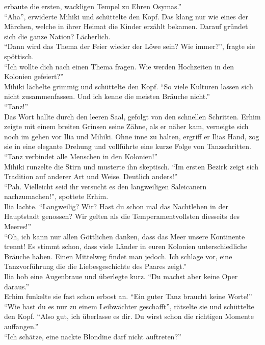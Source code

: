 erbaute die ersten, wackligen Tempel zu Ehren Osymas.''\\
``Aha'', erwiderte Mihiki und schüttelte den Kopf. Das klang nur wie eines der Märchen, welche 
in ihrer Heimat die Kinder erzählt bekamen. Darauf gründet sich die ganze Nation? Lächerlich.\\
``Dann wird das Thema der Feier wieder der Löwe sein? Wie immer?'', fragte sie spöttisch.\\
``Ich wollte dich nach einen Thema fragen. Wie werden Hochzeiten in den Kolonien gefeiert?''\\
Mihiki lächelte grimmig und schüttelte den Kopf. ``So viele Kulturen lassen sich nicht 
zusammenfassen. Und ich kenne die meisten Bräuche nicht.''\\
``Tanz!''\\
Das Wort hallte durch den leeren Saal, gefolgt von den schnellen Schritten. Erhim zeigte mit einem 
breiten Grinsen seine Zähne, als er näher kam, verneigte sich noch im gehen vor Ilia und Mihiki. 
Ohne inne zu halten, ergriff er Ilias Hand, zog sie in eine elegante Drehung und vollführte eine 
kurze Folge von Tanzschritten. ``Tanz verbindet alle Menschen in den Kolonien!''\\
Mihiki runzelte die Stirn und musterte ihn skeptisch. ``Im ersten Bezirk zeigt sich Tradition auf 
anderer Art und Weise. Deutlich anders!''\\
``Pah. Vielleicht seid ihr versucht es den langweiligen Saleicanern nachzumachen!'', spottete 
Erhim.\\
Ilia lachte. ``Langweilig? Wir? Hast du schon mal das Nachtleben in der Hauptstadt genossen? Wir 
gelten als die Temperamentvollsten diesseits des Meeres!''\\
``Oh, ich kann nur allen Göttlichen danken, dass das Meer unsere Kontinente trennt! Es stimmt 
schon, dass viele Länder in euren Kolonien unterschiedliche Bräuche haben. Einen Mittelweg findet 
man jedoch. Ich schlage vor, eine Tanzvorführung die die Liebesgeschichte des Paares zeigt.''\\
Ilia hob eine Augenbraue und überlegte kurz. ``Du machst aber keine Oper daraus.''\\
Erhim funkelte sie fast schon erbost an. ``Ein guter Tanz braucht keine Worte!''\\
``Wie hast du es nur zu einem Leibwächter geschafft'', rätselte sie und schüttelte den Kopf. ``Also 
gut, ich überlasse es dir. Du wirst schon die richtigen Momente auffangen.''\\
``Ich schätze, eine nackte Blondine darf nicht auftreten?''\\
